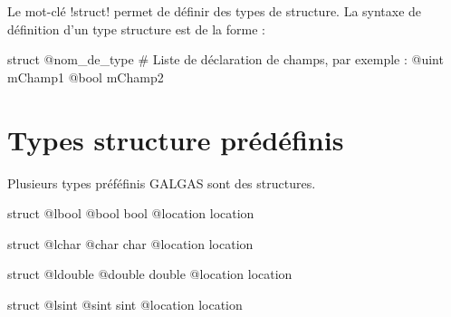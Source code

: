 


Le mot-clé \ggs!struct! permet de définir des types de structure. La syntaxe de définition d'un type structure est de la forme :

\begin{galgas}
struct @nom_de_type
  # Liste de déclaration de champs, par exemple :
  @uint mChamp1
  @bool mChamp2
\end{galgas}


\section{Types structure prédéfinis}

Plusieurs types préféfinis GALGAS sont des structures.
 

\begin{galgas}
struct @lbool {
  @bool bool
  @location location
}
\end{galgas}





\begin{galgas}
struct @lchar {
  @char char
  @location location
}
\end{galgas}








\begin{galgas}
struct @ldouble {
  @double double
  @location location
}
\end{galgas}








\begin{galgas}
struct @lsint {
  @sint sint
  @location location
}
\end{galgas}








